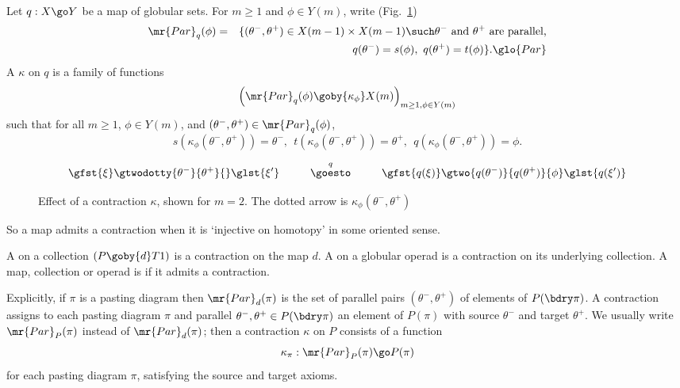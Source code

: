 \begin{defn}	
Let $q: X \go Y$ be a map of globular sets.  For $m\geq 1$ and $\phi\in
Y(m)$, write (Fig.~\ref{fig:contr-on-map})
%
\begin{eqnarray*}
\mr{Par}_q(\phi)	&
=	&
\{ (\theta^-, \theta^+) \in X(m-1) \times X(m-1) \such 
\theta^- \textrm{ and } \theta^+ \textrm{ are parallel,} 
\\ & &
q(\theta^-) = s(\phi), \textrm{ } q(\theta^+)= t(\phi)
\}.%
% 
\glo{Par}
% 
\end{eqnarray*}
%
A %
%
%
$\kappa$ on $q$ is a family of functions
\[
\left(
\mr{Par}_q(\phi) \goby{\kappa_\phi} X(m) 
\right)_{m\geq 1, \phi\in Y(m)}
\]
such that for all $m\geq 1$, $\phi\in Y(m)$, and $(\theta^-, \theta^+) \in
\mr{Par}_q(\phi)$, 
\[
s(\kappa_\phi(\theta^-, \theta^+)) = \theta^-,
\ \ 
t(\kappa_\phi(\theta^-, \theta^+)) = \theta^+,
\ \ 
q(\kappa_\phi(\theta^-, \theta^+)) = \phi.
\]
\end{defn}
% 
\begin{figure}
\[
\gfst{\xi}\gtwodotty{\theta^-}{\theta^+}{}\glst{\xi'}
\mbox{\hspace{2.5em}}
\stackrel{q}{\goesto}
\mbox{\hspace{2.5em}}
\gfst{q(\xi)}\gtwo{q(\theta^-)}{q(\theta^+)}{\phi}\glst{q(\xi')}
\]
\caption{Effect of a contraction $\kappa$, shown for $m=2$.  The dotted
  arrow is $\kappa_\phi(\theta^-, \theta^+)$}
\label{fig:contr-on-map}
\end{figure}
% 
So a map admits a contraction when it is `injective%
%
%
on homotopy' in some
oriented sense.

\begin{defn}	
A %
%
%
on a collection $(P \goby{d} T1)$ is a contraction on
the map $d$.  A %
%
%
on a globular operad is a contraction
on its underlying collection.  A map, collection or operad is
\demph{contractible}%
%
%
if it admits a contraction.
\end{defn}
% 
Explicitly, if $\pi$ is a pasting diagram then $\mr{Par}_d(\pi)$ is the set
of parallel pairs $(\theta^-, \theta^+)$ of elements of $P(\bdry\pi)$.  A
contraction assigns to each pasting diagram $\pi$ and parallel $\theta^-,
\theta^+ \in P(\bdry\pi)$ an element of $P(\pi)$ with source $\theta^-$ and
target $\theta^+$.  We usually write $\mr{Par}_P(\pi)$%
% 
% 
instead of $\mr{Par}_d(\pi)$; then a contraction $\kappa$
on $P$ consists of a function 
\[
\kappa_\pi: \mr{Par}_P(\pi) \go P(\pi)
\]
for each pasting diagram $\pi$, satisfying the source and target axioms.

